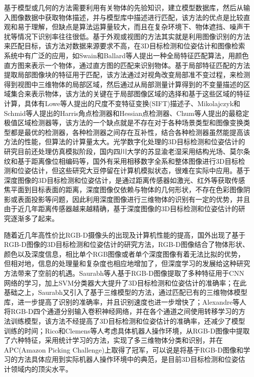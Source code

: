 基于模型或几何的方法需要利用有关物体的先验知识，建立模型数据库，然后从输入图像数据中获取物体描述，并与模型库中描述进行匹配，该方法的优点是比较直观和易于理解，但缺点是算法运算量较大，而且在复杂环境下、物体遮挡、噪声干扰等情况下识别率往往很低。基于外观或视图的方法其实就是利用图像识别的方法来匹配目标，该方法对数据来源要求不高，在3D目标检测和位姿估计和图像检索系统中有广泛的应用，如Swain和Ballard等人提出一种全局特征匹配算法\cite{swain1991color}，用颜色直方图来表示一个物体，通过直方图的匹配来识别物体。基于局部特征匹配的方法提取局部图像块的特征用于匹配，该方法通过对视角改变局部准不变过程，来检测得到视图中三维物体的局部区域，然后通过从局部测量计算得到的不变量描述的区域集合来表示物体，该方法的关键在于局部图像区域的选择和基于这些区域的特征计算，具体有Lowe等人提出的尺度不变特征变换(SIFT)描述子\cite{lowe1999object}、Mikolajczyk和Schmid等人提出的Harris角点检测器和Hessian点检测器\cite{matas2004robust}、Chum等人提出的最稳定极值区域检测器\cite{chum2004enhancing}等，该方法的一个缺点就是不存在对于各种场景类型和图像变换类型都是最优的检测器，各种检测器之间存在互补性，结合各种检测器虽然能提高该方法的性能，但算法的计算量太大。光学数字化处理的3D目标检测和位姿估计的研究目前还处理仿真模拟阶段，国内四川大学的苏显渝老湿采用结构光场、莫尔条纹和基于距离像位相编码等，国外有采用相移数字全系和整体图像\cite{matoba2001real}进行3D目标检测和位姿估计，但这些研究大豆停留在计算机模拟状态，很难在实际中应用。基于深度图像的3D目标检测和位姿估计，是通过距离传感器如激光、红外等获取传感焦平面到目标表面的距离，深度图像仅依赖与物体的几何形状，不存在色彩图像阴影或表面投影等问题，因此利用深度图像进行三维物体的识别有一定的优势，并且由于近几年距离传感器越来越精确，基于深度图像的3D目标检测和位姿估计的研究逐渐多了起来。

随着近几年高性价比RGB-D摄像头的出现及计算机性能的提高，国外出现了基于RGB-D图像的3D目标检测和位姿估计的研究方法，RGB-D图像结合了物体形状、颜色以及深度信息，相比单个RGB图像或者单个深度图像有着无法比拟的优势，但相对地，信息的处理量和复杂度也相应地增加了，但深度学习的发展给这种研究方法带来了空前的机遇。Saurabh等人基于RGB-D图像提取了多种特征用于CNN网络的学习，加上SVM分类器大大提升了3D目标检测和位姿估计的准确率\cite{Gupta2014}；在此基础之上，Saurabh又引入了基于三维模型的方法，通过匹配已有的三维物体模型库，进一步提高了识别的准确率，并且识别速度也进一步增快了\cite{Gupta2013}；Alexandre等人将RGB-D四个通道分别输入卷积神经网络，并在各个通道之间使用转移学习的方法训练模型，该方法不经提高了3D目标检测和位姿估计的准确率，还减少了模型训练的时间\cite{alexandre20163d}；Rico和Clemens等人考虑具体机器人操作环境，从RGB-D图像中提取了六种特征，采用统计学习的方法，实现了多三维物体分类和识别\cite{jonschkowski2016probabilistic}，并在APC(Amazon Picking Challenge)上取得了冠军，可以说是将基于RGB-D图像和学习的方法具体应用到实际机器人操作环境中的典范，是目前3D目标检测和位姿估计领域内的顶尖水平。


